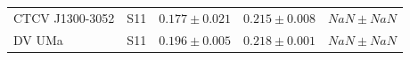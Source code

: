 \begin{table}
\begin{tabular}{llccc}
        CTCV J1300-3052     &  S11      & $0.177 \pm 0.021$ & $0.215 \pm 0.008$ & $    NaN \pm   NaN$ \\
        DV UMa              &  S11      & $0.196 \pm 0.005$ & $0.218 \pm 0.001$ & $    NaN \pm   NaN$ \\
        \hline
    \end{tabular}
\end{table}

